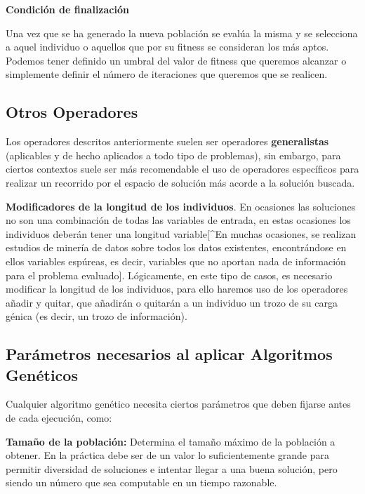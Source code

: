 \documentclass[
  a4paper,
  DIV=11,
  numbers=noendperiod]{scrreprt}
\begin{document}
\textbf{Condición de finalización}

Una vez que se ha generado la nueva población se evalúa la misma y se
selecciona a aquel individuo o aquellos que por su fitness se consideran
los más aptos. Podemos tener definido un umbral del valor de fitness que
queremos alcanzar o simplemente definir el número de iteraciones que
queremos que se realicen.

\subsection{Otros Operadores}\label{otros-operadores}

Los operadores descritos anteriormente suelen ser operadores
\textbf{generalistas} (aplicables y de hecho aplicados a todo tipo de
problemas), sin embargo, para ciertos contextos suele ser más
recomendable el uso de operadores específicos para realizar un recorrido
por el espacio de solución más acorde a la solución buscada.

\textbf{Modificadores de la longitud de los individuos}. En ocasiones
las soluciones no son una combinación de todas las variables de entrada,
en estas ocasiones los individuos deberán tener una longitud
variable{[}\^{}En muchas ocasiones, se realizan estudios de minería de
datos sobre todos los datos existentes, encontrándose en ellos variables
espúreas, es decir, variables que no aportan nada de información para el
problema evaluado{]}. Lógicamente, en este tipo de casos, es necesario
modificar la longitud de los individuos, para ello haremos uso de los
operadores añadir y quitar, que añadirán o quitarán a un individuo un
trozo de su carga génica (es decir, un trozo de información).

\subsection{Parámetros necesarios al aplicar Algoritmos
Genéticos}\label{paruxe1metros-necesarios-al-aplicar-algoritmos-genuxe9ticos}

Cualquier algoritmo genético necesita ciertos parámetros que deben
fijarse antes de cada ejecución, como:

\textbf{Tamaño de la población:} Determina el tamaño máximo de la
población a obtener. En la práctica debe ser de un valor lo
suficientemente grande para permitir diversidad de soluciones e intentar
llegar a una buena solución, pero siendo un número que sea computable en
un tiempo razonable.
\end{document}
